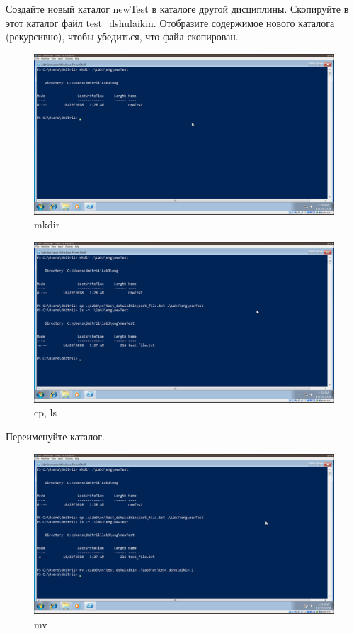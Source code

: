 \documentclass[a4paper]{article}
\begin{document}
Создайте новый каталог newTest в каталоге другой дисциплины. Скопируйте в этот каталог файл test\_dshulaikin. Отобразите содержимое нового каталога (рекурсивно), чтобы убедиться, что файл скопирован.

\begin{figure}[H]
    \centering
    \includegraphics[width=\linewidth]{25.png}
    \caption{mkdir}
\end{figure}


\begin{figure}[H]
    \centering
    \includegraphics[width=\linewidth]{26.png}
    \caption{cp, ls}
\end{figure}

Переименуйте каталог.

\begin{figure}[H]
    \centering
    \includegraphics[width=\linewidth]{27.png}
    \caption{mv}
\end{figure}
\end{document}
